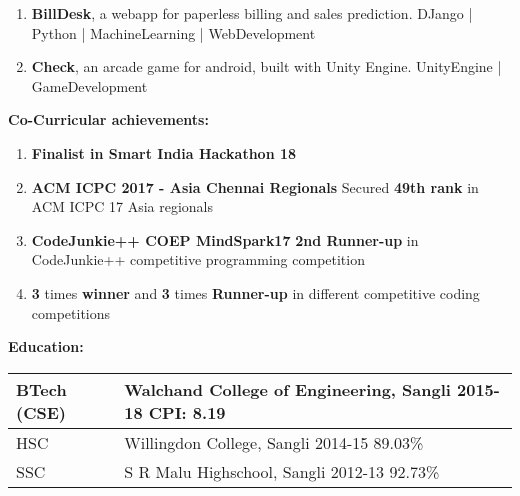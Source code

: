 \documentclass[11pt]{article}
\begin{document}
\begin{center}
\begin{minipage}[t]{0.6\textwidth}
\begin{LARGE}
{\begin{enumerate}
						ExtensionDevelopment | JS | HTML | CSS
						\item \textbf{BillDesk}, a webapp for paperless billing and sales prediction.\linebreak
						DJango | Python | MachineLearning | WebDevelopment
						\item \textbf{Check}, an arcade game for android, built with Unity Engine.\linebreak
						UnityEngine | GameDevelopment
					\end{enumerate}
				}
			\end{LARGE}
			\vspace{0.55cm}
            \begin{LARGE}
				\textbf{Co-Curricular achievements:}\medskip%
				{\small
					\begin{enumerate}
						\item \textbf{Finalist in Smart India Hackathon 18}
						\item \textbf{ACM ICPC 2017 - Asia Chennai Regionals}\linebreak
						Secured \textbf{49th rank} in ACM ICPC 17 Asia regionals
						\item \textbf{CodeJunkie++ COEP MindSpark17}\linebreak
						\textbf{2nd Runner-up} in CodeJunkie++ competitive programming competition
						\item \textbf{3} times \textbf{winner} and \textbf{3} times \textbf{Runner-up} in different competitive coding competitions
					\end{enumerate}
				}
			\end{LARGE}
			\vspace{0.55cm}
            \begin{LARGE}
				\textbf{Education:}
				\medskip\linebreak%
				\begin{tabu} to \textwidth {X[1.15l]X[6l]}
			   		\normalsize BTech (CSE) & {\normalsize Walchand College of Engineering, Sangli} \linebreak \normalsize 2015-18 \hspace{1cm}\normalsize CPI: 8.19\medskip\\
			   		\hline
			   		\normalsize HSC & \normalsize Willingdon College, Sangli \linebreak \normalsize 2014-15 \hspace{1cm}\normalsize 89.03\%\medskip\\
					\hline
				    \normalsize SSC & \normalsize S R Malu Highschool, Sangli \linebreak\normalsize 2012-13 \hspace{1cm}\normalsize 92.73\%\medskip\\

\end{tabu}
\end{LARGE}
\end{minipage}
\end{center}
\end{document}
